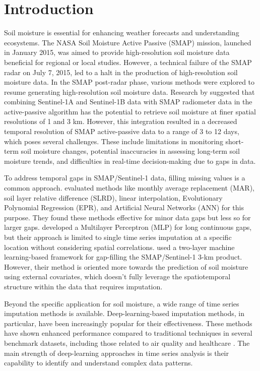 \documentclass[review]{elsarticle}
\begin{document}
\section{Introduction}
Soil moisture is essential for enhancing weather forecasts and understanding ecosystems. The NASA Soil Moisture Active Passive (SMAP) mission, launched in January 2015, was aimed to provide high-resolution soil moisture data beneficial for regional or local studies. However, a technical failure of the SMAP radar on July 7, 2015, led to a halt in the production of high-resolution soil moisture data. In the SMAP post-radar phase, various methods were explored to resume generating high-resolution soil moisture data. Research by \citet{das2019smap} suggested that combining Sentinel-1A and Sentinel-1B data with SMAP radiometer data in the active-passive algorithm has the potential to retrieve soil moisture at finer spatial resolutions of 1 and 3 km. However, this integration resulted in a decreased temporal resolution of SMAP active-passive data to a range of 3 to 12 days, which poses several challenges. These include limitations in monitoring short-term soil moisture changes, potential inaccuracies in assessing long-term soil moisture trends, and difficulties in real-time decision-making due to gaps in data.

To address temporal gaps in SMAP/Sentinel-1 data, filling missing values is a common approach.  \citet{kornelsen2014comparison} evaluated methods like monthly average replacement (MAR), soil layer relative difference (SLRD), linear interpolation, Evolutionary Polynomial Regression (EPR), and Artificial Neural Networks (ANN) for this purpose. They found these methods effective for minor data gaps but less so for larger gaps. \citet{park2023long} developed a Multilayer Perceptron (MLP) for long continuous gaps, but their approach is limited to single time series imputation at a specific location without considering spatial correlations. \citet{mao2019gap} used a two-layer machine learning-based framework for gap-filling the SMAP/Sentinel-1 3-km product. However, their method is oriented more towards the prediction of soil moisture using external covariates, which doesn't fully leverage the spatiotemporal structure within the data that requires imputation.

 Beyond the specific application for soil moisture, a wide range of time series imputation methods is available. Deep-learning-based imputation methods, in particular, have been increasingly popular for their effectiveness. These methods have shown enhanced performance compared to traditional techniques in several benchmark datasets, including those related to air quality \citep{yi2016st} and healthcare \citep{silva2012predicting}. The main strength of deep-learning approaches in time series analysis is their capability to identify and understand complex data patterns. 
 
\end{document}
